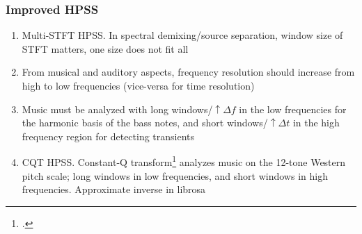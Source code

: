 \documentclass[usenames,dvipsnames]{beamer}
\begin{document}
\begin{frame}
	\frametitle{Improved HPSS}
	\begin{enumerate}
	\item
		Multi-STFT HPSS. In spectral demixing/source separation, window size of STFT matters, one size does not fit all
	\item
		From musical and auditory aspects, frequency resolution should increase from high to low frequencies (vice-versa for time resolution)
	\item
		Music must be analyzed with long windows/$\uparrow \Delta f$ in the low frequencies for the harmonic basis of the bass notes, and short windows/$\uparrow \Delta t$ in the high frequency region for detecting transients
	\item
		CQT HPSS. Constant-Q transform\footcite{jbrown} analyzes music on the 12-tone Western pitch scale; long windows in low frequencies, and short windows in high frequencies. Approximate inverse in librosa
	\end{enumerate}
\end{frame}
\end{document}
